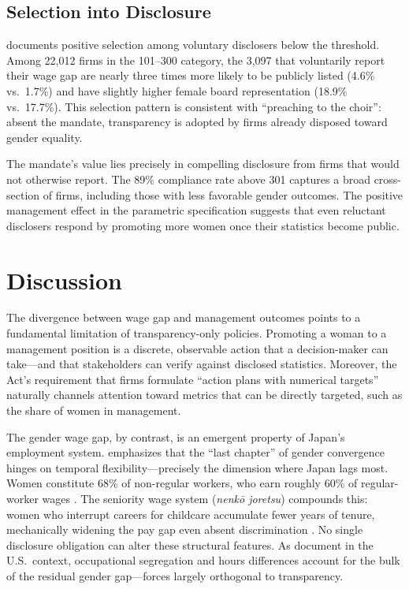 \documentclass[12pt]{article}
\begin{document}
\subsection{Selection into Disclosure}



 documents positive selection among voluntary disclosers below the threshold. Among 22,012 firms in the 101--300 category, the 3,097 that voluntarily report their wage gap are nearly three times more likely to be publicly listed (4.6\% vs.\ 1.7\%) and have slightly higher female board representation (18.9\% vs.\ 17.7\%). This selection pattern is consistent with ``preaching to the choir'': absent the mandate, transparency is adopted by firms already disposed toward gender equality.

The mandate's value lies precisely in compelling disclosure from firms that would not otherwise report. The 89\% compliance rate above 301 captures a broad cross-section of firms, including those with less favorable gender outcomes. The positive management effect in the parametric specification suggests that even reluctant disclosers respond by promoting more women once their statistics become public.


\section{Discussion}
\label{sec:discussion}

The divergence between wage gap and management outcomes points to a fundamental limitation of transparency-only policies. Promoting a woman to a management position is a discrete, observable action that a decision-maker can take---and that stakeholders can verify against disclosed statistics. Moreover, the Act's requirement that firms formulate ``action plans with numerical targets'' naturally channels attention toward metrics that can be directly targeted, such as the share of women in management.

The gender wage gap, by contrast, is an emergent property of Japan's employment system. \citet{goldin2014} emphasizes that the ``last chapter'' of gender convergence hinges on temporal flexibility---precisely the dimension where Japan lags most. Women constitute 68\% of non-regular workers, who earn roughly 60\% of regular-worker wages \citep{oecd2020}. The seniority wage system (\textit{nenkō joretsu}) compounds this: women who interrupt careers for childcare accumulate fewer years of tenure, mechanically widening the pay gap even absent discrimination \citep{kato2013}. No single disclosure obligation can alter these structural features. As \citet{blau2017} document in the U.S.\ context, occupational segregation and hours differences account for the bulk of the residual gender gap---forces largely orthogonal to transparency.
\end{document}
